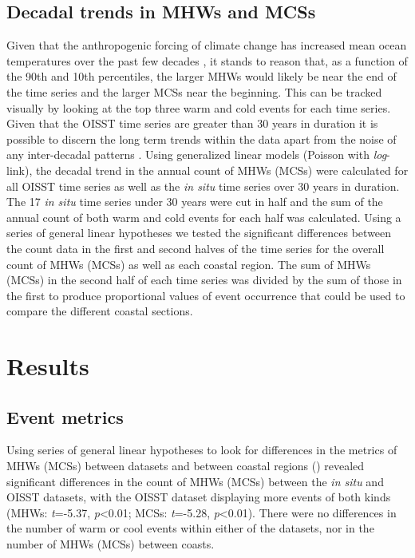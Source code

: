 \documentclass[a4paper,10pt,review]{elsarticle}
\begin{document}
\subsection{Decadal trends in MHWs and MCSs}
Given that the anthropogenic forcing of climate change has increased mean ocean temperatures over the past few decades \citep{IPCC2014}, it stands to reason that, as a function of the 90th and 10th percentiles, the larger MHWs would likely be near the end of the time series and the larger MCSs near the beginning. This can be tracked visually by looking at the top three warm and cold events for each time series. Given that the OISST time series are greater than 30 years in duration it is possible to discern the long term trends within the data apart from the noise of any inter-decadal patterns \citep{Schlegel2016}. Using generalized linear models (Poisson with \emph{log}-link), the decadal trend in the annual count of MHWs (MCSs) were calculated for all OISST time series as well as the \emph{in situ} time series over 30 years in duration. The 17 \emph{in situ} time series under 30 years were cut in half and the sum of the annual count of both warm and cold events for each half was calculated. Using a series of general linear hypotheses \citep{Hothorn2008} we tested the significant differences between the count data in the first and second halves of the time series for the overall count of MHWs (MCSs) as well as each coastal region. The sum of MHWs (MCSs) in the second half of each time series was divided by the sum of those in the first to produce proportional values of event occurrence that could be used to compare the different coastal sections.

\section{Results}

\subsection{Event metrics}
Using series of general linear hypotheses \citep{Hothorn2008} to look for differences in the metrics of MHWs (MCSs) between datasets and between coastal regions () revealed significant differences in the count of MHWs (MCSs) between the \emph{in situ} and OISST datasets, with the OISST dataset displaying more events of both kinds (MHWs: \emph{t}=-5.37, \emph{p}<0.01; MCSs: \emph{t}=-5.28, \emph{p}<0.01). There were no differences in the number of warm or cool events within either of the datasets, nor in the number of MHWs (MCSs) between coasts.
\end{document}

